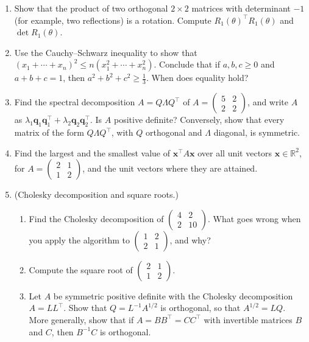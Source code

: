 \begin{enumerate}[leftmargin=*]
    \item Show that the product of two orthogonal $2 \times 2$ matrices with determinant $-1$ (for example, two reflections) is a rotation. Compute $R_1(\theta)^\top R_1(\theta)$ and $\det R_1(\theta)$.
    \item Use the Cauchy--Schwarz inequality to show that $(x_1 + \cdots + x_n)^2 \leq n(x_1^2 + \cdots + x_n^2)$. Conclude that if $a, b, c \geq 0$ and $a + b + c = 1$, then $a^2 + b^2 + c^2 \geq \frac{1}{3}$. When does equality hold?
    \item \homework{} Find the spectral decomposition $A = Q\Lambda Q^\top$ of $A = \begin{pmatrix} 5 & 2 \\ 2 & 2 \end{pmatrix}$, and write $A$ as $\lambda_1 \mathbf{q}_1 \mathbf{q}_1^\top + \lambda_2 \mathbf{q}_2 \mathbf{q}_2^\top$. Is $A$ positive definite? Conversely, show that every matrix of the form $Q\Lambda Q^\top$, with $Q$ orthogonal and $\Lambda$ diagonal, is symmetric.
    \item Find the largest and the smallest value of $\mathbf{x}^\top A \mathbf{x}$ over all unit vectors $\mathbf{x} \in \mathbb{R}^2$, for $A = \begin{pmatrix} 2 & 1 \\ 1 & 2 \end{pmatrix}$, and the unit vectors where they are attained.
    \item\label{L2-ex2:sqrt-cholesky} (Cholesky decomposition and square roots.)
    \begin{enumerate}
        \item Find the Cholesky decomposition of $\begin{pmatrix} 4 & 2 \\ 2 & 10 \end{pmatrix}$. What goes wrong when you apply the algorithm to $\begin{pmatrix} 1 & 2 \\ 2 & 1 \end{pmatrix}$, and why?
        \item Compute the square root of $\begin{pmatrix} 2 & 1 \\ 1 & 2 \end{pmatrix}$.
        \item Let $A$ be symmetric positive definite with the Cholesky decomposition $A = LL^\top$. Show that $Q = L^{-1}A^{1/2}$ is orthogonal, so that $A^{1/2} = LQ$. More generally, show that if $A = BB^\top = CC^\top$ with invertible matrices $B$ and $C$, then $B^{-1}C$ is orthogonal.

\end{enumerate}
\end{enumerate}
